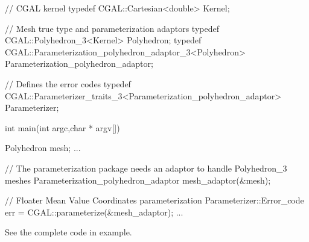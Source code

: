 \begin{ccExampleCode}

// CGAL kernel
typedef CGAL::Cartesian<double>                         Kernel;

// Mesh true type and parameterization adaptors
typedef CGAL::Polyhedron_3<Kernel>                      Polyhedron;
typedef CGAL::Parameterization_polyhedron_adaptor_3<Polyhedron>
                                                        Parameterization_polyhedron_adaptor;

// Defines the error codes
typedef CGAL::Parameterizer_traits_3<Parameterization_polyhedron_adaptor>
                                                        Parameterizer;

int main(int argc,char * argv[])
{
    Polyhedron mesh;
    ...

    // The parameterization package needs an adaptor to handle Polyhedron_3 meshes
    Parameterization_polyhedron_adaptor mesh_adaptor(&mesh);

    // Floater Mean Value Coordinates parameterization
    Parameterizer::Error_code err = CGAL::parameterize(&mesh_adaptor);
    ...
}

\end{ccExampleCode}

See the complete code in  example.


